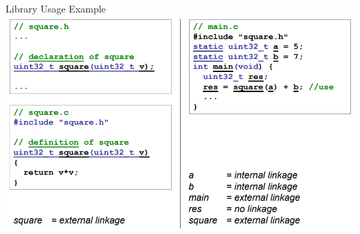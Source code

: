 \begin{example2}{Library Usage Example}
  \includegraphics[width=\linewidth]{images/modular_coding_linking_lectureexample.png}
\end{example2}




